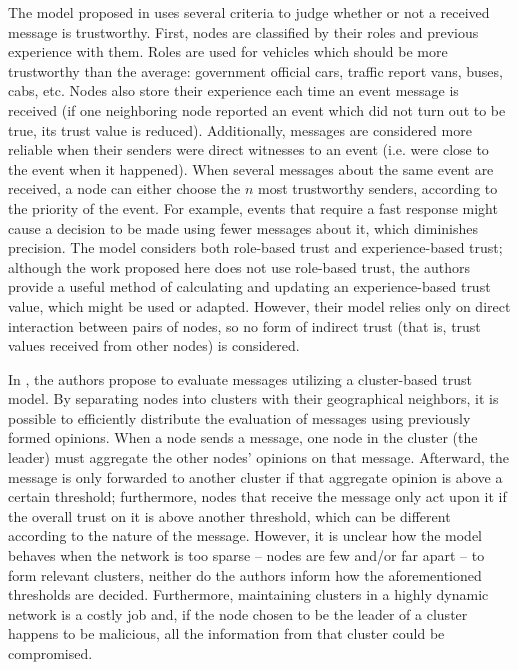 The model proposed in \citep{minhas2010towards} uses several criteria to judge whether or not a received message is trustworthy.
First, nodes are classified by their roles and previous experience with them.
Roles are used for vehicles which should be more trustworthy than the average: government official cars, traffic report vans, buses, cabs, etc.
Nodes also store their experience each time an event message is received (if one neighboring node reported an event which did not turn out to be true, its trust value is reduced).
Additionally, messages are considered more reliable when their senders were direct witnesses to an event (i.e. were close to the event when it happened).
When several messages about the same event are received, a node can either choose the $n$ most trustworthy senders, according to the priority of the event.
For example, events that require a fast response might cause a decision to be made using fewer messages about it, which diminishes precision.
The model considers both role-based trust and experience-based trust; although the work proposed here does not use role-based trust, the authors provide a useful method of calculating and updating an experience-based trust value, which might be used or adapted.
However, their model relies only on direct interaction between pairs of nodes, so no form of indirect trust (that is, trust values received from other nodes) is considered.


In \citep{chen2010trust}, the authors propose to evaluate messages utilizing a cluster-based trust model.
By separating nodes into clusters with their geographical neighbors, it is possible to efficiently distribute the evaluation of messages using previously formed opinions.
When a node sends a message, one node in the cluster (the leader) must aggregate the other nodes' opinions on that message.
Afterward, the message is only forwarded to another cluster if that aggregate opinion is above a certain threshold; furthermore, nodes that receive the message only act upon it if the overall trust on it is above another threshold, which can be different according to the nature of the message.
However, it is unclear how the model behaves when the network is too sparse -- nodes are few and/or far apart -- to form relevant clusters, neither do the authors inform how the aforementioned thresholds are decided.
Furthermore, maintaining clusters in a highly dynamic network is a costly job and, if the node chosen to be the leader of a cluster happens to be malicious, all the information from that cluster could be compromised.


